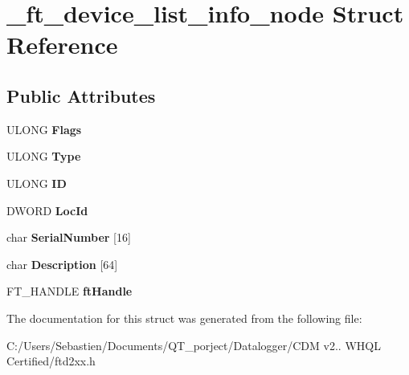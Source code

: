 \hypertarget{struct__ft__device__list__info__node}{}\section{\+\_\+ft\+\_\+device\+\_\+list\+\_\+info\+\_\+node Struct Reference}
\label{struct__ft__device__list__info__node}
\subsection*{Public Attributes}
\begin{DoxyCompactItemize}
\item 
\mbox{\label{struct__ft__device__list__info__node_a721b47fa89702eff50b231f17c4298e6}} 
U\+L\+O\+NG {\bfseries Flags}
\item 
\mbox{\label{struct__ft__device__list__info__node_aa764a1406eb904ad4444a82f2f950b4e}} 
U\+L\+O\+NG {\bfseries Type}
\item 
\mbox{\label{struct__ft__device__list__info__node_a6f486d775e8b49190ec48e99cdbdcbe5}} 
U\+L\+O\+NG {\bfseries ID}
\item 
\mbox{\label{struct__ft__device__list__info__node_a11f8898a6bc9a91abadb14c02cac4394}} 
D\+W\+O\+RD {\bfseries Loc\+Id}
\item 
\mbox{\label{struct__ft__device__list__info__node_a833aa1d16c8e1034840397921ae92413}} 
char {\bfseries Serial\+Number} \mbox{[}16\mbox{]}
\item 
\mbox{\label{struct__ft__device__list__info__node_a2ed17bec72cbe5e73a2e83cd29a8e681}} 
char {\bfseries Description} \mbox{[}64\mbox{]}
\item 
\mbox{\label{struct__ft__device__list__info__node_a3a26fc5e6180c4f87dec4ebf1951d100}} 
F\+T\+\_\+\+H\+A\+N\+D\+LE {\bfseries ft\+Handle}
\end{DoxyCompactItemize}


The documentation for this struct was generated from the following file\+:\begin{DoxyCompactItemize}
\item 
C\+:/\+Users/\+Sebastien/\+Documents/\+Q\+T\+\_\+porject/\+Datalogger/\+C\+D\+M v2.. W\+H\+Q\+L Certified/ftd2xx.\+h\end{DoxyCompactItemize}
